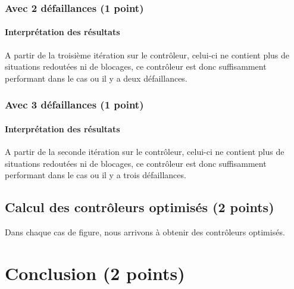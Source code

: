\documentclass[a4paper]{book}
\begin{document}
\subsubsection{Avec 2 défaillances (1 point)}





\paragraph{Interprétation des résultats}
A partir de la troisième itération sur le contrôleur, celui-ci ne contient plus de situations redoutées ni de blocages, ce contrôleur est donc suffisamment performant dans le cas ou il y a deux défaillances.

\subsubsection{Avec 3 défaillances (1 point)}





\paragraph{Interprétation des résultats}
A partir de la seconde itération sur le contrôleur, celui-ci ne contient plus de situations redoutées ni de blocages, ce contrôleur est donc suffisamment performant dans le cas ou il y a trois défaillances.

\subsection{Calcul des contrôleurs optimisés (2 points)}
Dans chaque cas de figure, nous arrivons à obtenir des contrôleurs optimisés.

\section{Conclusion (2 points)}
\end{document}
